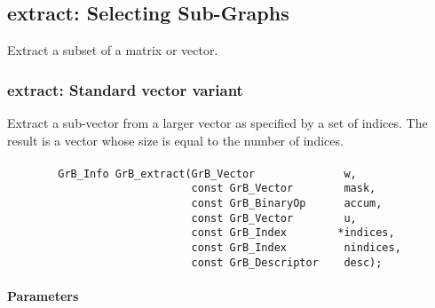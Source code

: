 \subsection{{\sf extract}: Selecting Sub-Graphs}
\label{Sec:extract}

Extract a subset of a matrix or vector. 


\subsubsection{{\sf extract}: Standard vector variant}

Extract a sub-vector from a larger vector as specified by a set of indices. 
The result is a vector whose size is equal to the number of indices.

\paragraph{\syntax}

\begin{verbatim}
        GrB_Info GrB_extract(GrB_Vector              w,
                             const GrB_Vector        mask,
                             const GrB_BinaryOp      accum,
                             const GrB_Vector        u,
                             const GrB_Index        *indices,
                             const GrB_Index         nindices,
                             const GrB_Descriptor    desc);
\end{verbatim}

\paragraph{Parameters}

